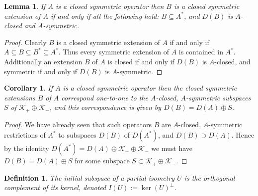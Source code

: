\documentclass[12pt,oneside]{report}
\newtheorem{cor}[thm]{Corollary}
\newtheorem{lem}[thm]{Lemma}
\newtheorem{defn}[thm]{Definition}
\begin{document}
\begin{lem}
    If $A$ is a closed symmetric operator then $B$ is a closed symmetric extension of $A$ if and only if all the following hold: $B \subseteq A^{*}$, and $D(B)$ is $A$-closed and $A$-symmetric.
\end{lem}
\begin{proof}
    Clearly $B$ is a closed symmetric extension of $A$ if and only if $A \subseteq B \subseteq B^{*} \subseteq A^{*}$. Thus every symmetric extension of $A$ is contained in $A^{*}$. Additionally an extension $B$ of $A$ is closed if and only if $D(B)$ is $A$-closed, and symmetric if and only if $D(B)$ is $A$-symmetric.
\end{proof}

\begin{cor}\label{Aclosed-Asymm}
    If $A$ is a closed symmetric operator then the closed symmetric extensions $B$ of $A$ correspond one-to-one to the $A$-closed, $A$-symmetric subspaces $S$ of $\mathscr{K}_{+} \oplus \mathscr{K}_{-}$, and this correspondence is given by $D(B) = D(A) \oplus S$.
\end{cor}
\begin{proof}
    We have already seen that such operators $B$ are $A$-closed, $A$-symmetric restrictions of $A^{*}$ to subspaces $D(B)$ of $D(A^{*})$, and $D(B) \supset D(A)$. Hence by the identity $D(A^{*}) = D(A) \oplus \mathscr{K}_{+} \oplus \mathscr{K}_{-}$ we must have $D(B) = D(A) \oplus S$ for some subspace $S \subset \mathscr{K}_{+} \oplus \mathscr{K}_{-}$.
\end{proof}

\begin{defn}
    The initial subspace of a partial isometry $U$ is the orthogonal complement of its kernel, denoted $I(U) := \ker(U)^{\perp}$.
\end{defn}
\end{document}
